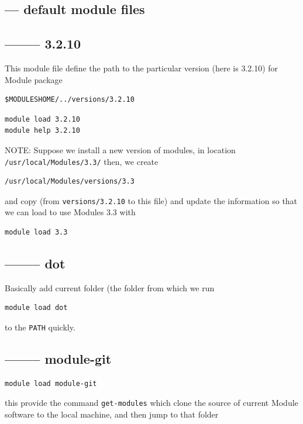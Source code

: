 \subsection{--- default module files}
\label{sec:default-modulefiles}



\subsection{-------- 3.2.10}
\label{sec:module-update-version}

This module file define the path to the particular version (here is 3.2.10) for
Module package
\begin{verbatim}
$MODULESHOME/../versions/3.2.10
\end{verbatim}

\begin{verbatim}
module load 3.2.10
module help 3.2.10
\end{verbatim}

NOTE: Suppose we install a new version of modules, in location
\verb!/usr/local/Modules/3.3/! then, we create
\begin{verbatim}
/usr/local/Modules/versions/3.3
\end{verbatim}
and copy (from \verb!versions/3.2.10! to this file) and update the information
so that we can load to use Modules 3.3 with 
\begin{verbatim}
module load 3.3
\end{verbatim}

\subsection{-------- dot}


Basically add current folder (the folder from which we run 
\begin{verbatim}
module load dot
\end{verbatim}
to the \verb!PATH! quickly.




\subsection{-------- module-git}

\begin{verbatim}
module load module-git
\end{verbatim}
this provide the command \verb!get-modules! which clone the source of current
Module software to the local machine, and then jump to that folder


